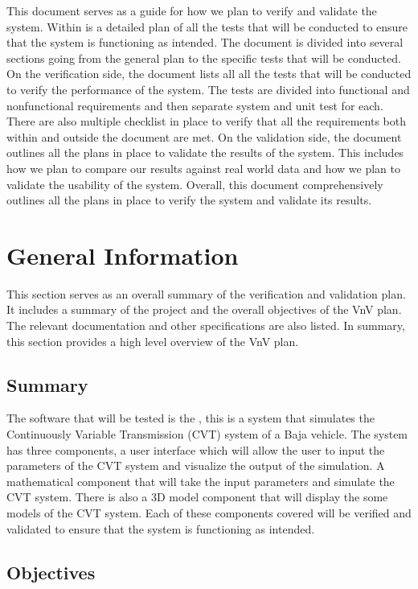 \documentclass[12pt, titlepage]{article}
\begin{document}
\noindent This document serves as a guide for how we plan to verify and validate the \progname{} system.
Within is a detailed plan of all the tests that will be conducted to ensure that the system is functioning as intended.
The document is divided into several sections going from the general plan to the specific tests that will be conducted.
On the verification side, the document lists all all the tests that will be conducted to verify the performance of the system.
The tests are divided into functional and nonfunctional requirements and then separate system and unit test for each.
There are also multiple checklist in place to verify that all the requirements both within and outside the document are met.
On the validation side, the document outlines all the plans in place to validate the results of the system.
This includes how we plan to compare our results against real world data and how we plan to validate the usability of the system.
Overall, this document comprehensively outlines all the plans in place to verify the system and validate its results.

\section{General Information}

This section serves as an overall summary of the verification and validation plan.
It includes a summary of the project and the overall objectives of the VnV plan.
The relevant documentation and other specifications are also listed.
In summary, this section provides a high level overview of the VnV plan.

\subsection{Summary}

The software that will be tested is the \progname{}, this is a system that simulates the Continuously Variable Transmission (CVT) system of a Baja vehicle.
The system has three components, a user interface which will allow the user to input the parameters of the CVT system and visualize the output of the simulation.
A mathematical component that will take the input parameters and simulate the CVT system.
There is also a 3D model component that will display the some models of the CVT system. 
Each of these components covered will be verified and validated to ensure that the system is functioning as intended.

\subsection{Objectives}
\end{document}
